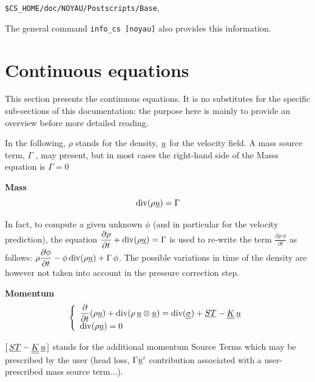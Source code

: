 \begin{center}
\texttt{\$CS\_HOME/doc/NOYAU/Postscripts/Base},
\end{center}

The general command \texttt{info\_cs [noyau]} also provides this
information.

\newpage %

\section{Continuous equations}


This section presents the continuous equations. It is no substitutes for the
specific sub-sections of this documentation: the purpose here is mainly to
provide an overview before more detailed reading.

In the following, $\rho $ stands for the density, $\underline{u}$ for the
velocity field. A mass source term, $\Gamma $ , may present, but in most
cases the right-hand side of the Masss equation is $\Gamma =0$

\textbf{Mass}\newline
\begin{equation}
\text{div}(\rho \underline{u})=\Gamma
\end{equation}

In fact, to compute a given unknown $\phi$ (and in particular for the
velocity prediction), the equation $\displaystyle \frac{\partial \rho}{%
\partial t} + \dive(\rho \vect{u}) = \Gamma$ is used to re-write the term $%
\displaystyle \frac{\partial \rho\,\phi}{\partial t}$ as follows:
\mbox{$\displaystyle \rho\frac{\partial  \phi}{\partial t} - \phi\,\text{div}(\rho \underline{u})
+ \Gamma\,\phi$}. The possible variations in time of the density are however
not taken into account in the pressure correction step.

\clearpage \textbf{Momentum}
\begin{equation}
\left\{
\begin{array}{l}
\displaystyle\frac{\partial }{\partial t}(\rho \vect{u})+\dive(\rho \,%
\vect{u}\otimes \vect{u})=\dive(\tens{\sigma})+\vect{ST}-\tens{K}\,\vect{u}
\\
\dive(\rho \vect{u})=0%
\end{array}%
\right.
\end{equation}

$[\,\underline{ST}-\underline{\underline{K}}\,\underline{u}\,]$ stands for the additional momentum
Source Terms which may be prescribed by the user (head loss, $\Gamma \vect{u}%
^{i}$ contribution associated with a user-prescribed mass source term...).

